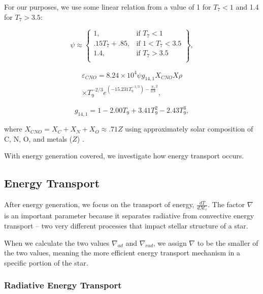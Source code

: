\documentclass[twocolumn]{aastex631}
\begin{document}
For our purposes, we use some linear relation from a value of 1 for $T_7 < 1$ and 1.4 for $T_7 > 3.5$:

\begin{equation}
\psi \approx 
\left\{
    \begin{array}{ll}
        1, & \text{if } T_7 < 1\\
        .15 T_7 + .85, & \text{if } 1 < T_7 < 3.5\\
		1.4, & \text{if } T_7 > 3.5\\
    \end{array}
\right\},
\end{equation}

\begin{equation}
\begin{split}
    \label{CNO}
    \varepsilon _{CNO} = 8.24 \times 10^{4} \psi g_{14,1} X_{CNO}X \rho \\
    \times T_9^{-2/3} e^{(-15.231T_9^{-1/3}) - \frac{T_9}{0.8}^2},
\end{split}
\end{equation}

\begin{equation}
    \label{g14,1}
    g_{14,1} = 1 - 2.00T_9 + 3.41T_9^2 - 2.43T_9^3,
\end{equation}

\noindent where $X_{CNO} = X_C + X_N + X_O \approx .71 Z$ using approximately solar composition of C, N, O, and metals ($Z$) \citep{opal}.

With energy generation covered, we investigate how energy transport occurs.

\subsection{Energy Transport}

After energy generation, we focus on the transport of energy, $\frac{d T}{d\mathcal{M}_r}$. The factor $\nabla$ is an important parameter because it separates radiative from convective energy transport -- two very different processes that impact stellar structure of a star.

When we calculate the two values $\nabla_{ad}$ and $\nabla_{rad}$, we assign $\nabla$ to be the smaller of the two values, meaning the more efficient energy transport mechanism in a specific portion of the star. 

\subsubsection{Radiative Energy Transport}
\end{document}
